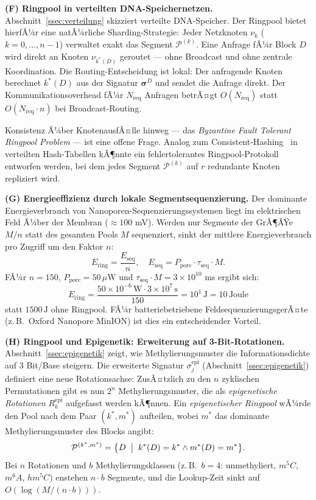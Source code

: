 ﻿\documentclass[a4paper,12pt]{article}
\theoremstyle{definition}
\theoremstyle{plain}
\begin{document}
\textbf{(F) Ringpool in verteilten DNA-Speichernetzen.}
Abschnitt~\ref{ssec:verteilung} skizziert verteilte DNA-Speicher.
Der Ringpool bietet hierfÃ¼r eine natÃ¼rliche Sharding-Strategie:
Jeder Netzknoten $\nu_k$ ($k = 0, \ldots, n-1$) verwaltet exakt das
Segment $\mathcal{P}^{(k)}$.  Eine Anfrage fÃ¼r Block $D$ wird direkt
an Knoten $\nu_{k^*(D)}$ geroutet --- ohne Broadcast und ohne zentrale
Koordination.  Die Routing-Entscheidung ist lokal: Der anfragende Knoten
berechnet $k^*(D)$ aus der Signatur $\boldsymbol{\sigma}^D$ und sendet
die Anfrage direkt.  Der Kommunikationsoverhead fÃ¼r $N_{\mathrm{req}}$
Anfragen betrÃ¤gt $O(N_{\mathrm{req}})$ statt $O(N_{\mathrm{req}} \cdot n)$
bei Broadcast-Routing.

Konsistenz Ã¼ber KnotenausfÃ¤lle hinweg --- das \emph{Byzantine Fault
Tolerant Ringpool Problem} --- ist eine offene Frage.  Analog zum
Consistent-Hashing~\cite{karger1997} in verteilten Hash-Tabellen kÃ¶nnte
ein fehlertolerantes Ringpool-Protokoll entworfen werden, bei dem jedes
Segment $\mathcal{P}^{(k)}$ auf $r$ redundante Knoten repliziert wird.

\textbf{(G) Energieeffizienz durch lokale Segmentsequenzierung.}
Der dominante Energieverbrauch von Nanoporen-Sequenzierungssystemen
liegt im elektrischen Feld Ã¼ber der Membran ($\approx 100$ mV).  Werden
nur Segmente der GrÃ¶ÃŸe $M/n$ statt des gesamten Pools $M$ sequenziert,
sinkt der mittlere Energieverbrauch pro Zugriff um den Faktor $n$:
\[
  E_{\mathrm{ring}} = \frac{E_{\mathrm{seq}}}{n},
  \quad E_{\mathrm{seq}} = P_{\mathrm{pore}} \cdot \tau_{\mathrm{seq}} \cdot M.
\]
FÃ¼r $n = 150$, $P_{\mathrm{pore}} = 50\,\mu$W und
$\tau_{\mathrm{seq}} \cdot M = 3 \times 10^{10}$ ms ergibt sich:
\[
  E_{\mathrm{ring}} = \frac{50 \times 10^{-6}\,\text{W} \cdot 3 \times 10^7\,\text{s}}{150}
  = 10^1\,\text{J} = 10\,\text{Joule}
\]
statt $1500\,\text{J}$ ohne Ringpool.  FÃ¼r batteriebetriebene
FeldsequenzierungsgerÃ¤te (z.\,B.\ Oxford Nanopore MinION) ist dies ein
entscheidender Vorteil.

\textbf{(H) Ringpool und Epigenetik: Erweiterung auf 3-Bit-Rotationen.}
Abschnitt~\ref{ssec:epigenetik} zeigt, wie Methylierungsmuster die
Informationsdichte auf $3$ Bit/Base steigern.  Die erweiterte
Signatur $\sigma_j^{\mathrm{epi}}$ (Abschnitt~\ref{ssec:epigenetik})
definiert eine neue Rotationsachse: ZusÃ¤tzlich zu den $n$ zyklischen
Permutationen gibt es nun $2^n$ Methylierungsmuster, die als
\emph{epigenetische Rotationen} $R_k^{\mathrm{epi}}$ aufgefasst werden
kÃ¶nnen.  Ein \emph{epigenetischer Ringpool} wÃ¼rde den Pool nach dem
Paar $(k^*, m^*)$ aufteilen, wobei $m^*$ das dominante Methylierungsmuster
des Blocks angibt:
\[
  \mathcal{P}^{(k^*, m^*)} = \bigl\{D \;\bigm|\;
    k^*(D) = k^* \wedge m^*(D) = m^*\bigr\}.
\]
Bei $n$ Rotationen und $b$ Methylierungsklassen (z.\,B.\ $b = 4$:
unmethyliert, $m^5C$, $m^6A$, $hm^5C$) enstehen $n \cdot b$ Segmente,
und die Lookup-Zeit sinkt auf $O(\log(M/(n \cdot b)))$.
\end{document}

